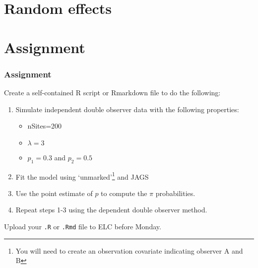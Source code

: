 \documentclass[color=usenames,dvipsnames]{beamer}\usepackage[]{graphicx}\usepackage[]{color}
\begin{document}
\section{Random effects}





\section{Assignment}




\begin{frame}[fragile]
  \frametitle{Assignment}
  \footnotesize
  Create a self-contained R script or Rmarkdown file
  to do the following:
  \vfill
  \begin{enumerate}
    \footnotesize
    \item Simulate \alert{independent} double observer data with the following
      properties:
      \begin{itemize}
        \item nSites=200
        \item $\lambda=3$
        \item $p_1=0.3$ and $p_2=0.5$
      \end{itemize}
    \item Fit the model using `unmarked'\footnote{\scriptsize You will
        need to create an observation covariate indicating observer A
        and B} and JAGS
    \item Use the point estimate of $p$ to compute the $\pi$ probabilities.
    \item Repeat steps 1-3 using the \alert{dependent} double observer
      method. 
  \end{enumerate}
  \vfill
  Upload your {\tt .R} or {\tt .Rmd} file to ELC before Monday. 
\end{frame}
\end{document}
